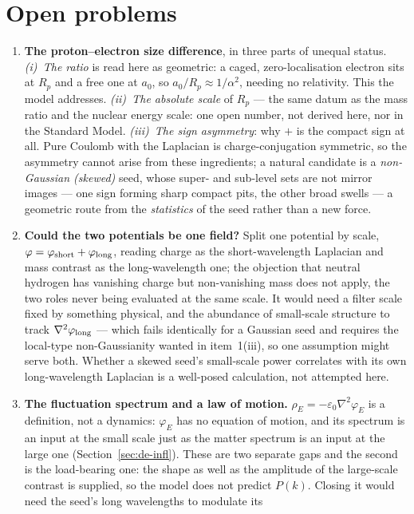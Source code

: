 \documentclass[11pt]{article}
\newcommand{\grad}{\nabla}
\begin{document}
\section{Open problems}\label{sec:open}
\begin{enumerate}\itemsep2pt
\item \textbf{The proton--electron size difference}, in three parts of unequal status. \emph{(i)~The ratio} is
read here as geometric: a caged, zero-localisation electron sits at $R_p$ and a free one at $a_0$, so
$a_0/R_p\approx1/\alpha^2$, needing no relativity. This the model addresses. \emph{(ii)~The absolute scale} of
$R_p$ --- the same datum as the mass ratio and the nuclear energy scale: one open number, not derived here, nor in
the Standard Model. \emph{(iii)~The sign asymmetry}: why $+$ is the compact sign at all. Pure Coulomb with the
Laplacian is charge-conjugation symmetric, so the asymmetry cannot arise from these ingredients; a natural
candidate is a \emph{non-Gaussian (skewed)} seed, whose super- and sub-level sets are not mirror images --- one
sign forming sharp compact pits, the other broad swells --- a geometric route from the \emph{statistics} of the
seed rather than a new force.
\item \textbf{Could the two potentials be one field?} Split one potential by scale,
$\varphi=\varphi_{\rm short}+\varphi_{\rm long}$, reading charge as the short-wavelength Laplacian and mass
contrast as the long-wavelength one; the objection that neutral hydrogen has vanishing charge but non-vanishing
mass does not apply, the two roles never being evaluated at the same scale. It would need a filter scale fixed by
something physical, and the abundance of small-scale structure to track $\grad^2\varphi_{\rm long}$ --- which
fails identically for a Gaussian seed and requires the local-type non-Gaussianity wanted in item~1(iii), so one
assumption might serve both. Whether a skewed seed's small-scale power correlates with its own long-wavelength
Laplacian is a well-posed calculation, not attempted here.
\item \textbf{The fluctuation spectrum and a law of motion.} $\rho_E=-\varepsilon_0\grad^2\varphi_E$ is a
definition, not a dynamics: $\varphi_E$ has no equation of motion, and its spectrum is an input at the small scale
just as the matter spectrum is an input at the large one (Section~\ref{sec:de-infl}). These are two separate gaps
and the second is the load-bearing one: the shape as well as the amplitude of the large-scale contrast is
supplied, so the model does not predict $P(k)$. Closing it would need the seed's long wavelengths to modulate its

\end{enumerate}
\end{document}
